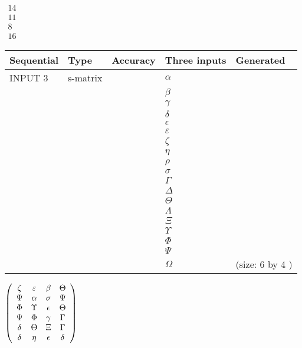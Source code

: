 \documentclass[12pt]{article}
\begin{document}
   
 $\begin{array}{
 c
 }
 14  \\ 
 11  \\ 
 8  \\ 
 16
\end{array}  $ 
  
  
\noindent\begin{tabular}{|l|l|l|l|l|}
\hline
 Sequential & Type & Accuracy & Three inputs & Generated \\ 
\hline
 
 
  INPUT $  3 $ & s-matrix & & 
 $  \alpha $ & 
  \\
  & & & 
 $  \beta $ & 
  \\
  & & & 
 $  \gamma $ & 
  \\
  & & & 
 $  \delta $ & 
  \\
  & & & 
 $  \epsilon $ & 
  \\
  & & & 
 $  \varepsilon $ & 
  \\
  & & & 
 $                     \zeta $ & 
  \\
  & & & 
 $  \eta $ & 
  \\
  & & & 
 $  \rho $ & 
  \\
  & & & 
 $  \sigma $ & 
  \\
  & & & 
 $  \Gamma $ & 
  \\
  & & & 
 $  \Delta $ & 
  \\
  & & & 
 $  \Theta $ & 
  \\
  & & & 
 $  \Lambda $ & 
  \\
  & & & 
 $                     \Xi $ & 
  \\
  & & & 
 $  \Upsilon $ & 
  \\
  & & & 
 $  \Phi $ & 
  \\
  & & & 
 $  \Psi $ & 
  \\
  & & & 
 $  \Omega $ & 
  (size:  6  by  4 )
 \\  \hline  
 \end{tabular}
   
   
 $  \left( \begin{array}
 {
 c
 c
 c
 c
 }
                    \zeta & 
 \varepsilon & 
 \beta & 
 \Theta \\ 
 \Psi & 
 \alpha & 
 \sigma & 
 \Psi \\ 
 \Phi & 
 \Upsilon & 
 \epsilon & 
 \Theta \\ 
 \Psi & 
 \Phi & 
 \gamma & 
 \Gamma \\ 
 \delta & 
 \Theta & 
                    \Xi & 
 \Gamma \\ 
 \delta & 
 \eta & 
 \epsilon & 
 \delta
 \end{array} \right) $ 
  
\end{document}
